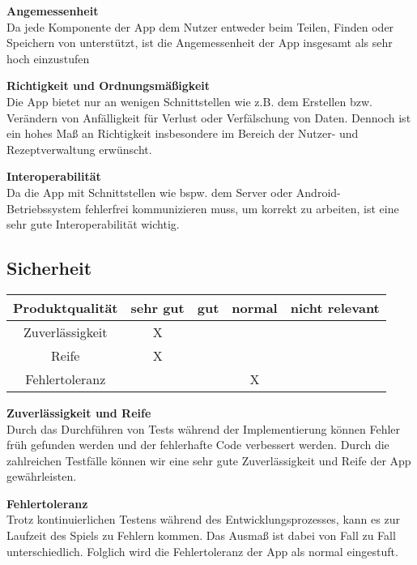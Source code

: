 \documentclass[parskip=full]{scrartcl}
\begin{document}
\textbf{Angemessenheit}\\
Da jede Komponente der App dem Nutzer entweder beim Teilen, Finden oder Speichern von  unterstützt, ist die Angemessenheit der App insgesamt als sehr hoch einzustufen

\textbf{Richtigkeit und Ordnungsmäßigkeit}\\
Die App bietet nur an wenigen Schnittstellen wie z.B. dem Erstellen bzw. Verändern von  Anfälligkeit für Verlust oder Verfälschung von Daten. Dennoch ist ein hohes Maß an Richtigkeit insbesondere im Bereich der Nutzer- und Rezeptverwaltung erwünscht.

\textbf{Interoperabilität}\\
Da die App mit Schnittstellen wie bspw. dem Server oder Android-Betriebssystem fehlerfrei kommunizieren muss, um korrekt zu arbeiten, ist eine sehr gute Interoperabilität wichtig.

\subsection{Sicherheit}
\begin{tabular}{| c | c | c | c | c |}
    \hline
    \textbf{Produktqualität} & \textbf{sehr gut} & \textbf{gut} & \textbf{normal} & \textbf{nicht relevant} \\ \hline
    Zuverlässigkeit          & X                 &              &                 &                         \\ \hline
    Reife                    & X                 &              &                 &                         \\ \hline
    Fehlertoleranz           &                   &              & X               &                         \\ \hline
\end{tabular}

\textbf{Zuverlässigkeit und Reife}\\
Durch das Durchführen von Tests während der Implementierung können Fehler früh gefunden werden und der fehlerhafte Code verbessert werden.
Durch die zahlreichen Testfälle können wir eine sehr gute Zuverlässigkeit und Reife der App gewährleisten.

\textbf{Fehlertoleranz}\\
Trotz kontinuierlichen Testens während des Entwicklungsprozesses, kann es zur Laufzeit des Spiels zu Fehlern kommen.
Das Ausmaß ist dabei von Fall zu Fall unterschiedlich.
Folglich wird die Fehlertoleranz der App als normal eingestuft.
\end{document}
